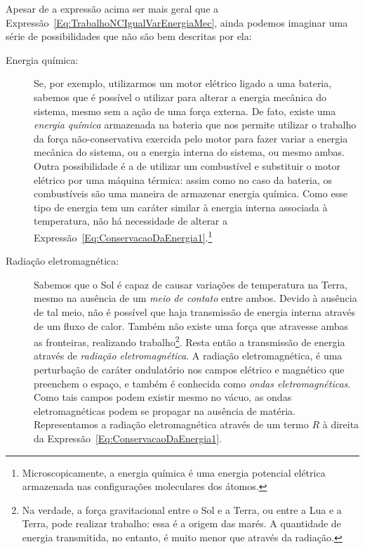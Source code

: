 Apesar de a expressão acima ser mais geral que a Expressão~\eqref{Eq:TrabalhoNCIgualVarEnergiaMec}, ainda podemos imaginar uma série de possibilidades que não são bem descritas por ela:
\begin{description}
    \item[Energia química:] Se, por exemplo, utilizarmos um motor elétrico ligado a uma bateria, sabemos que é possível o utilizar para alterar a energia mecânica do sistema, mesmo sem a ação de uma força externa. De fato, existe uma \emph{energia química} armazenada na bateria que nos permite utilizar o trabalho da força não-conservativa exercida pelo motor para fazer variar a energia mecânica do sistema, ou a energia interna do sistema, ou mesmo ambas. Outra possibilidade é a de utilizar um combustível e substituir o motor elétrico por uma máquina térmica: assim como no caso da bateria, os combustíveis são uma maneira de armazenar energia química. Como esse tipo de energia tem um caráter similar à energia interna associada à temperatura, não há necessidade de alterar a Expressão~\eqref{Eq:ConservacaoDaEnergia1}.\footnote{Microscopicamente, a energia química é uma energia potencial elétrica armazenada nas configurações moleculares dos átomos.}

    \item[Radiação eletromagnética:] Sabemos que o Sol é capaz de causar variações de temperatura na Terra, mesmo na ausência de um \emph{meio de contato} entre ambos. Devido à ausência de tal meio, não é possível que haja transmissão de energia interna através de um fluxo de calor. Também não existe uma força que atravesse ambas as fronteiras, realizando trabalho\footnote{Na verdade, a força gravitacional entre o Sol e a Terra, ou entre a Lua e a Terra, pode realizar trabalho: essa é a origem das marés. A quantidade de energia transmitida, no entanto, é muito menor que através da radiação.}. Resta então a transmissão de energia através de \emph{radiação eletromagnética}. A radiação eletromagnética, é uma perturbação de caráter ondulatório nos campos elétrico e magnético que preenchem o espaço, e também é conhecida como \emph{ondas eletromagnéticas}. Como tais campos podem existir mesmo no vácuo, as ondas eletromagnéticas podem se propagar na ausência de matéria. Representamos a radiação eletromagnética através de um termo $R$ à direita da Expressão~\eqref{Eq:ConservacaoDaEnergia1}.
\end{description}
 
